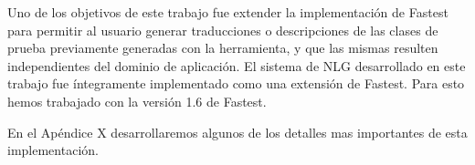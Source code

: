 Uno de los objetivos de este trabajo fue extender la implementación de Fastest para permitir al usuario generar traducciones o descripciones de las clases de prueba previamente generadas con la herramienta, y que las mismas resulten independientes del dominio de aplicación.
El sistema de NLG desarrollado en este trabajo fue íntegramente implementado como una extensión de Fastest. Para esto hemos trabajado con la versión 1.6 de Fastest.

En el Apéndice X desarrollaremos algunos de los detalles mas importantes de esta implementación.